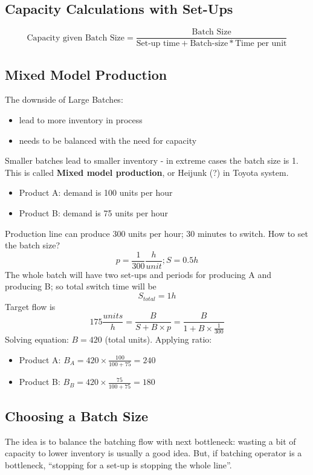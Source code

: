 \documentclass{scrartcl}
\begin{document}
\subsection{Capacity Calculations with Set-Ups}
\label{sec:05-02}
$$\mbox{Capacity given Batch Size} = \frac{\mbox{Batch Size}}{\mbox{Set-up time} + \mbox{Batch-size} * \mbox{Time per unit}}$$

\subsection{Mixed Model Production}
\label{sec:05-03}

The downside of Large Batches:
\begin{itemize}
\item lead to more inventory in process
\item needs to be balanced with the need for capacity
\end{itemize}
Smaller batches lead to smaller inventory - in extreme cases the batch size is 1. This is called {\bf Mixed model production}, or Heijunk (?) in Toyota system.
\begin{itemize}
\item Product A: demand is 100 units per hour
\item Product B: demand is 75 units per hour
\end{itemize}
Production line can produce 300 units per hour; 30 minutes to switch. How to set the batch size?
$$p = \frac1{300} \frac{h}{unit}; S = 0.5h$$
The whole batch will have two set-ups and periods for producing A and producing B; so total switch time will be
$$S_{total} = 1h$$
Target flow is
$$175 \frac{units}{h} = \frac{B}{S + B \times p} = \frac{B}{1 + B\times \frac1{300}}$$
Solving equation: $B = 420$ (total units). Applying ratio:
\begin{itemize}
\item Product A: $B_A = 420 \times \frac{100}{100+75} = 240$
\item Product B: $B_B = 420 \times \frac{75}{100+75} = 180$
\end{itemize}

\subsection{Choosing a Batch Size}
\label{sec:05-04}
The idea is to balance the batching flow with next bottleneck: wasting a bit of capacity to lower inventory is usually a good idea. But, if batching operator is a bottleneck, ``stopping for a set-up is stopping the whole line''.
\end{document}
